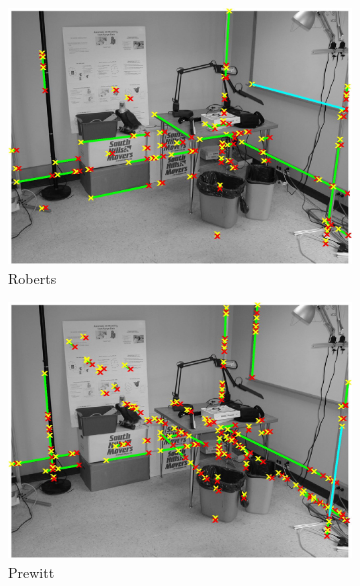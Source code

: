 \documentclass[lettersize,journal]{IEEEtran}
\begin{document}
\begin{figure}[h]
    \centering 
     
    \begin{subfigure}[h]{0.21\textwidth}
        \centering 
        \includegraphics[width=\linewidth]{hough_lines_roberts_0.03}
        \caption{Roberts}  
    \end{subfigure}
    \begin{subfigure}[h]{0.21\textwidth}
        \centering
        \includegraphics[width=\linewidth]{hough_lines_prewitt_0.025}
        \caption{Prewitt}  
    \end{subfigure}
    \begin{subfigure}[h]{0.21\textwidth}
        \centering

\end{subfigure}
\end{figure}
\end{document}

